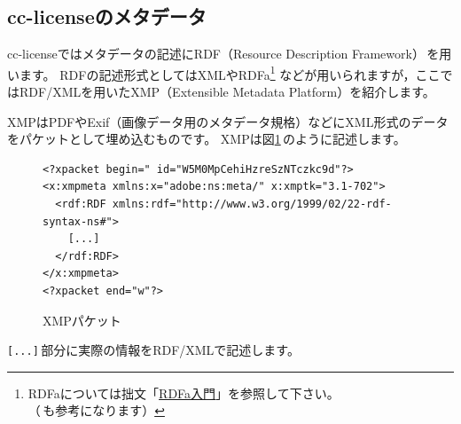 \documentclass{ltjsarticle}
\begin{document}
\subsection{cc-licenseのメタデータ}

cc-licenseではメタデータの記述にRDF（Resource Description Framework）\cite{Book:KANZAKI-RDF}\,を用います。
RDFの記述形式としてはXMLやRDFa\footnote{RDFaについては拙文「\href{http://www.baldanders.info/spiegel/archive/rdfa/}{RDFa入門}」を参照して下さい。（\cite{Book:KANZAKI-SHX}\,も参考になります）
} などが用いられますが，ここではRDF/XMLを用いたXMP（Extensible Metadata Platform）を紹介します。

XMPはPDFやExif（画像データ用のメタデータ規格）などにXML形式のデータをパケットとして埋め込むものです。
XMPは図\ref{fig:xmp}\,のように記述します。
\begin{figure}[htp]
\begin{mdframed}
\small
\begin{verbatim}
<?xpacket begin="﻿ id="W5M0MpCehiHzreSzNTczkc9d"?>
<x:xmpmeta xmlns:x="adobe:ns:meta/" x:xmptk="3.1-702">
  <rdf:RDF xmlns:rdf="http://www.w3.org/1999/02/22-rdf-syntax-ns#">
    [...]
  </rdf:RDF>
</x:xmpmeta>
<?xpacket end="w"?>
\end{verbatim}
\end{mdframed}
\caption{XMPパケット} \label{fig:xmp}
\end{figure}%
\verb|[...]|\,部分に実際の情報をRDF/XMLで記述します。
\end{document}
